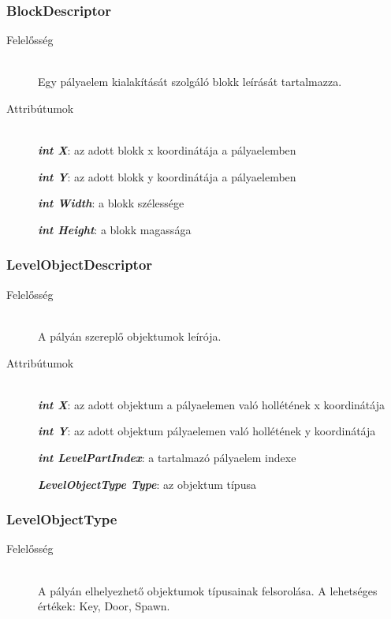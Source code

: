 \subsubsection{BlockDescriptor}
	\begin{description}
		\item[Felelősség] \hfill \\
		Egy pályaelem kialakítását szolgáló blokk leírását tartalmazza.
				
		\item[Attribútumok]\hfill \\
		\textbf{\emph{int X}}: az adott blokk x koordinátája a pályaelemben
		
		\textbf{\emph{int Y}}: az adott blokk y koordinátája a pályaelemben
		
		\textbf{\emph{int Width}}: a blokk szélessége
		
		\textbf{\emph{int Height}}: a blokk magassága
						
	\end{description}

\subsubsection{LevelObjectDescriptor}
	\begin{description}
		\item[Felelősség] \hfill \\
		A pályán szereplő objektumok leírója.
		
		\item[Attribútumok]\hfill \\
		\textbf{\emph{int X}}: az adott objektum a pályaelemen való hollétének x koordinátája
		
		\textbf{\emph{int Y}}: az adott objektum pályaelemen való hollétének y koordinátája
		
		\textbf{\emph{int LevelPartIndex}}: a tartalmazó pályaelem indexe
		
		\textbf{\emph{LevelObjectType Type}}: az objektum típusa
						
	\end{description}

\subsubsection{LevelObjectType}
	\begin{description}
		\item[Felelősség] \hfill \\
		A pályán elhelyezhető objektumok típusainak felsorolása. A lehetséges értékek: Key, Door, Spawn.
		
	\end{description}

